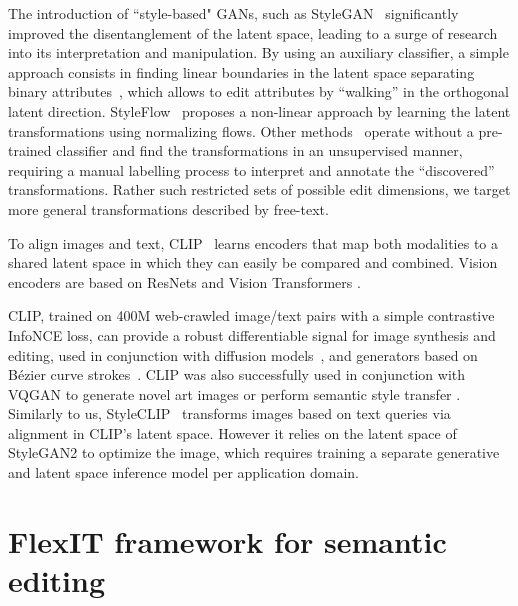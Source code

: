 The introduction of ``style-based" GANs, such as  
StyleGAN~\cite{karras19cvpr, karras20cvpr, Karras2021stylegan3} significantly 
improved the disentanglement of the latent space, leading to a surge of research 
into its interpretation and manipulation. By using an auxiliary classifier, a simple 
approach consists in finding linear boundaries in the latent space separating binary 
attributes~\cite{shen2020, zhuang2021enjoy, Goetschalckxganalyze}, which allows to edit
 attributes by ``walking'' in the orthogonal latent direction.
StyleFlow~\cite{abdal2020styleflow} proposes a non-linear approach by learning the 
latent transformations using normalizing flows. Other 
methods~\cite{harkonen2020ganspace, voynov20icml} operate without a pre-trained
classifier and find the transformations in an unsupervised manner, requiring a manual
 labelling process to interpret and annotate the ``discovered'' transformations. 
 Rather such  restricted sets of possible edit dimensions, we target more general
  transformations described by free-text.



To align images and text, CLIP~\cite{radford21clip} learns encoders that map both 
modalities to a shared latent space in which they can easily be compared and combined.
 Vision encoders are based on ResNets \cite{he2016deep} and Vision Transformers
  \cite{dosovitskiy2020image}.

CLIP, trained on 400M web-crawled image/text pairs with a simple contrastive  InfoNCE
 loss\cite{oord18arxiv},  can provide a robust differentiable signal for image
  synthesis and editing, used in conjunction with diffusion 
  models~\cite{kim2021diffusionclip}, and  generators based on B\'ezier curve 
  strokes~\cite{frans2021clipdraw}. CLIP was also successfully used in conjunction
   with VQGAN to generate novel art images \cite{vqgan_clip} or perform semantic
    style transfer \cite{vqgan_semantic_style_transfer}.
Similarly to us, StyleCLIP~\cite{patashnik2021styleclip} transforms images based
 on text queries via alignment in CLIP's latent space. However it relies on the 
 latent space of StyleGAN2 to optimize the image, which requires training a separate 
 generative and latent space inference model per application domain.



\section{FlexIT framework for semantic editing}


